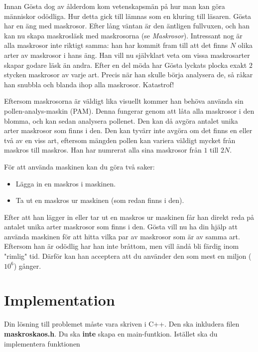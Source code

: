 \noindent
Innan Gösta dog av ålderdom kom vetenskapsmän på hur man kan göra människor odödliga. Hur detta gick till lämnas som en
kluring till läsaren. Gösta har en äng med maskrosor. Efter lång väntan är den äntligen fullvuxen, och han kan nu skapa
maskrosläsk med maskrosorna (se \textit{Maskrosor}). Intressant nog är alla maskrosor inte riktigt samma: han har kommit
fram till att det finns $N$ olika arter av maskrosor i hans äng. Han vill nu självklart veta om vissa maskrosarter skapar
godare läsk än andra. Efter en del möda har Gösta lyckats plocka exakt $2$
stycken maskrosor av varje art. Precis när han skulle börja analysera de, så råkar han snubbla och blanda ihop alla
maskrosor. Katastrof!

Eftersom maskrosorna är väldigt lika visuellt kommer han behöva använda sin pollen-analys-maskin (PAM). 
Denna fungerar genom att låta alla maskrosor i den blomma, och kan sedan analysera pollenet. Den kan då avgöra
antalet unika arter maskrosor som finns i den. Den kan tyvärr inte avgöra om det finns en eller två av en viss art,
eftersom mängden pollen kan variera väldigt mycket från maskros till maskros. Han har numrerat alla sina maskrosor
från $1$ till $2N$. 

För att använda maskinen kan du göra två saker:
\begin{itemize}
  \item Lägga in en maskros i maskinen.
  \item Ta ut en maskros ur maskinen (som redan finns i den).
\end{itemize}

Efter att han lägger in eller tar ut en maskros ur maskinen får han direkt reda på antalet unika arter maskrosor
som finns i den.
Gösta vill nu ha din hjälp att använda maskinen för att hitta vilka par av maskrosor som är av samma art.
Eftersom han är odödlig har han inte bråttom, men vill ändå bli färdig inom "rimlig" tid. Därför kan han acceptera
att du använder den som mest en miljon ($10^6$) gånger.

\section*{Implementation}
Din lösning till problemet måste vara skriven i C++. Den ska inkludera filen \textbf{maskroskaos.h}. 
Du ska \textbf{inte} skapa en main-funtkion. Istället ska du implementera funktionen\\

